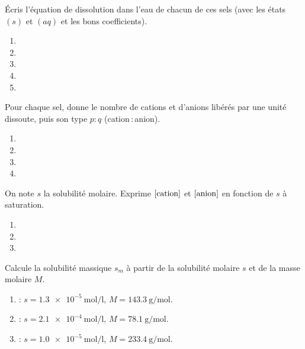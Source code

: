 \documentclass[11pt,a4paper]{article}
\begin{document}
\begin{exo}
Écris l'équation de dissolution dans l'eau de chacun de ces sels (avec les états $(s)$ et $(aq)$ et les
bons coefficients).
\begin{enumerate}[label=\alph*)]
  \item {}
  \item {}
  \item {}
  \item {}
  \item {}
\end{enumerate}
\end{exo}

\begin{exo}
Pour chaque sel, donne le nombre de cations et d'anions libérés par une unité dissoute, puis son
type $p{:}q$ (cation$\,$:$\,$anion).
\begin{enumerate}[label=\alph*)]
  \item {}
  \item {}
  \item {}
  \item {}
\end{enumerate}
\end{exo}

\begin{exo}
On note $s$ la solubilité molaire. Exprime $[\ce{cation}]$ et $[\ce{anion}]$ en fonction de $s$ à
saturation.
\begin{enumerate}[label=\alph*)]
  \item {}
  \item {}
  \item {}
\end{enumerate}
\end{exo}

\begin{exo}[du molaire au massique : $s_m = s\times M$]
Calcule la solubilité massique $s_m$ à partir de la solubilité molaire $s$ et de la masse molaire $M$.
\begin{enumerate}[label=\alph*)]
  \item {} : $s=\qty{1.3e-5}{\mole\per\litre}$, $M=\qty{143.3}{\gram\per\mole}$.
  \item {} : $s=\qty{2.1e-4}{\mole\per\litre}$, $M=\qty{78.1}{\gram\per\mole}$.
  \item {} : $s=\qty{1.0e-5}{\mole\per\litre}$, $M=\qty{233.4}{\gram\per\mole}$.
\end{enumerate}
\end{exo}
\end{document}
